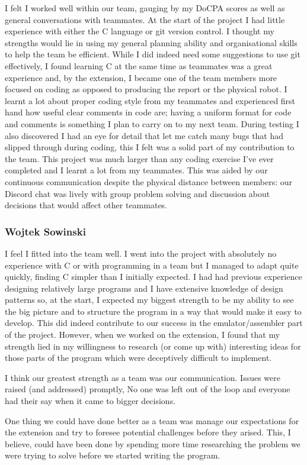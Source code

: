 \documentclass[8pt]{article}
\begin{document}
I felt I worked well within our team, gauging by my DoCPA scores as well as general conversations 
with teammates. At the start of the project I had little experience with either the C language or 
git version control. I thought my strengths would lie in using my general planning ability and 
organisational skills to help the team be efficient. While I did indeed need some suggestions to use
 git effectively, I found learning C at the same time as teammates was a great experience and, by the extension, I became one of
the team members more focused on coding as opposed to producing the report or the physical robot.
I learnt a lot about proper coding style from my teammates and experienced first hand how useful 
clear comments in code are; having a uniform format for code and comments is something I plan to carry
on to my next team. During testing I also discovered I had an eye for detail that let me catch many 
bugs that had slipped through during coding, this I felt was a solid part of my contribution 
to the team. 
This project was much larger than any coding exercise I've ever completed and I learnt a lot from
my teammates. This was aided by our continuous communication despite the physical 
distance between members: our Discord chat was lively with group problem solving and discussion 
about decisions that would affect other teammates.

\subsubsection{Wojtek Sowinski}

I feel I fitted into the team well. I went into the project with absolutely no experience with C
or with programming in a team but I managed to adapt quite quickly, finding C simpler than I
initially expected. I had had previous experience designing relatively large programs and I have
extensive knowledge of design patterns so, at the start, I expected my biggest strength to be my 
ability to see the big picture and to structure the program in a way that would make it easy to
develop. This did indeed contribute to our success in the emulator/assembler part of the project.
However, when we worked on the extension, I found that my strength lied in my willingness to 
research (or come up with) interesting ideas for those parts of the program which were deceptively
difficult to implement.

I think our greatest strength as a team was our communication. Issues were raised (and addressed)
promptly, No one was left out of the loop and everyone had their say when it came to bigger decisions.

One thing we could have done better as a team was manage our expectations for the extension and try to
foresee potential challenges before they arised. This, I believe, could have been done by 
spending more time researching the problem we were trying to solve before we started writing the
program.
\end{document}

